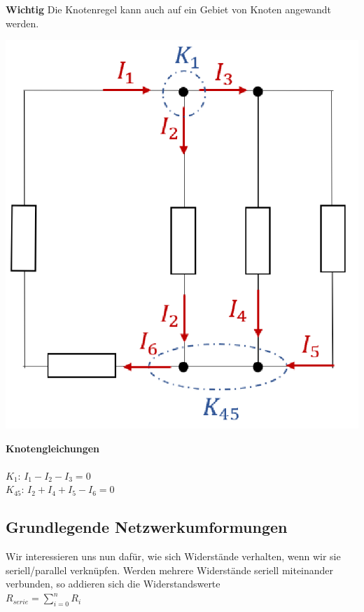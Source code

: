 										\textbf{Wichtig} Die Knotenregel kann auch auf ein Gebiet von Knoten angewandt werden. \\


										\begin{minipage}{0.6\textwidth}
										\begin{flushright}
												\includegraphics[scale=0.4]{img/knotengl.png}
											\end{flushright}
										\end{minipage}
										\begin{minipage}{0.4\textwidth}

											\textbf{Knotengleichungen} \\ \\
											$\displaystyle K_1$: $ I_1 - I_2 - I_3 = 0 $ \\
											$\displaystyle K_{45}$: $ I_2 + I_4 + I_5 - I_6 = 0 $ \\
										\end{minipage}


					\newpage

										\subsection{Grundlegende Netzwerkumformungen}
										Wir interessieren uns nun dafür, wie sich Widerstände verhalten, wenn wir sie seriell/parallel verknüpfen.
										\beginip
										Werden mehrere Widerstände seriell miteinander verbunden, so addieren sich die Widerstandswerte \\
										\formulaBegin
										$\displaystyle R_{serie} = \sum_{i=0}^n R_i $
										\formulaEnd
										\iend

